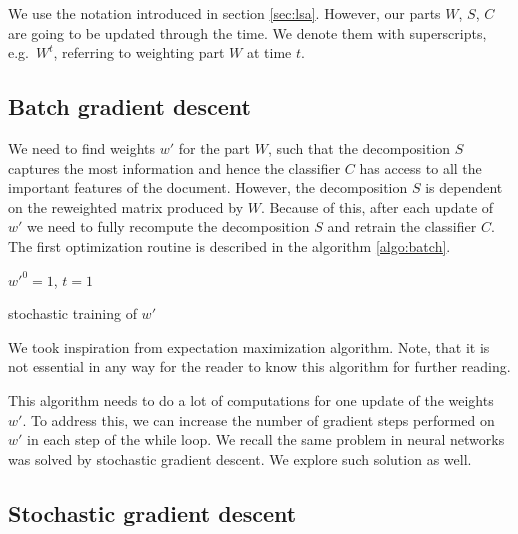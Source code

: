     We use the notation introduced in section \ref{sec:lsa}.
    However, our parts $W$, $S$, $C$ are going to be updated through the time. We denote them with superscripts, e.g.~$W^t$, referring to weighting part $W$ at time $t$.
    
    \subsection{Batch gradient descent}
    
    We need to find weights $w'$ for the part $W$, 
    such that the decomposition $S$ captures the most information and hence the classifier $C$ has access to all the important features of the document.
    However, the decomposition $S$ is dependent on the reweighted matrix produced by $W$. 
    Because of this, after each update of $w'$ we need to fully recompute the decomposition $S$ and retrain the classifier $C$.
    The first optimization routine is described in the algorithm \ref{algo:batch}.
    
    \medskip
    
    \begin{algorithm}[H]
        $w'^0 = 1$, $t=1$\;
        \caption{stochastic training of $w'$} \label{algo:batch}
    \end{algorithm}
    
    We took inspiration from expectation maximization algorithm.  
    Note, that it is not essential in any way for the reader to know this algorithm for further reading.
    
    This algorithm needs to do a lot of computations for one update of the weights $w'$.
    To address this, we can increase the number of gradient steps performed on $w'$ in each step of the while loop.
    We recall the same problem in neural networks was solved by stochastic gradient descent.
    We explore such solution as well.
    
    \subsection{Stochastic gradient descent}
    
